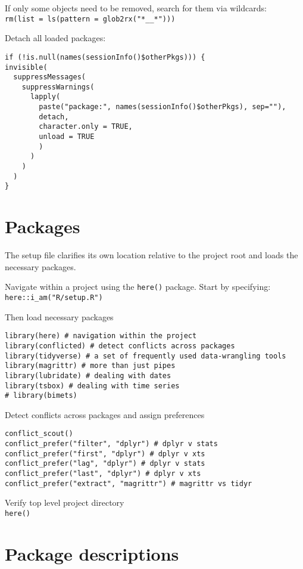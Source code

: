 \documentclass[
  letterpaper,
  DIV=11,
  numbers=noendperiod]{scrreport}
\begin{document}
If only some objects need to be removed, search for them via
wildcards:\\
\texttt{rm(list\ =\ ls(pattern\ =\ glob2rx("*\_\_*")))}

Detach all loaded packages:

\begin{verbatim}
if (!is.null(names(sessionInfo()$otherPkgs))) {
invisible(
  suppressMessages(
    suppressWarnings(
      lapply(
        paste("package:", names(sessionInfo()$otherPkgs), sep=""), 
        detach, 
        character.only = TRUE, 
        unload = TRUE
        )
      )
    )
  )
}
\end{verbatim}

\hypertarget{packages}{%
\section{Packages}\label{packages}}

The setup file clarifies its own location relative to the project root
and loads the necessary packages.

Navigate within a project using the \texttt{here()} package. Start by
specifying:\\
\texttt{here::i\_am("R/setup.R")}

Then load necessary packages

\begin{verbatim}
library(here) # navigation within the project
library(conflicted) # detect conflicts across packages
library(tidyverse) # a set of frequently used data-wrangling tools
library(magrittr) # more than just pipes
library(lubridate) # dealing with dates
library(tsbox) # dealing with time series
# library(bimets)
\end{verbatim}

Detect conflicts across packages and assign preferences

\begin{verbatim}
conflict_scout()
conflict_prefer("filter", "dplyr") # dplyr v stats
conflict_prefer("first", "dplyr") # dplyr v xts
conflict_prefer("lag", "dplyr") # dplyr v stats
conflict_prefer("last", "dplyr") # dplyr v xts
conflict_prefer("extract", "magrittr") # magrittr vs tidyr
\end{verbatim}

Verify top level project directory\\
\texttt{here()}

\hypertarget{package-descriptions}{%
\section{Package descriptions}\label{package-descriptions}}
\end{document}

